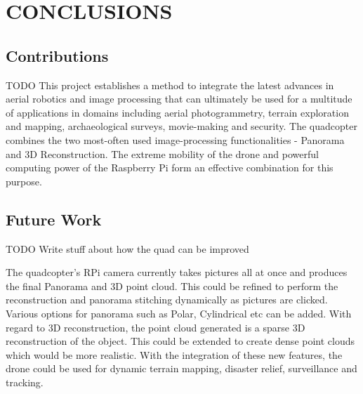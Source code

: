 
\chapter{CONCLUSIONS} %
\section{Contributions}
TODO
This project establishes a method to integrate the latest advances in aerial robotics and image processing that can ultimately be used for a multitude of applications in domains including aerial photogrammetry, terrain exploration and mapping, archaeological surveys, movie-making and security. The quadcopter combines the two most-often used image-processing functionalities - Panorama and 3D Reconstruction. The extreme mobility of the drone and powerful computing power of the Raspberry Pi form an effective combination for this purpose. 
\section{Future Work}
TODO
Write stuff about how the quad can be improved

The quadcopter's RPi camera currently takes pictures all at once and produces the final Panorama and 3D point cloud. This could be refined to perform the reconstruction and panorama stitching dynamically as pictures are clicked. Various options for panorama such as Polar, Cylindrical etc can be added. With regard to 3D reconstruction, the point cloud generated is a sparse 3D reconstruction of the object. This could be extended to create dense point clouds which would be more realistic.
With the integration of these new features, the drone could be used for dynamic terrain mapping, disaster relief, surveillance and tracking.